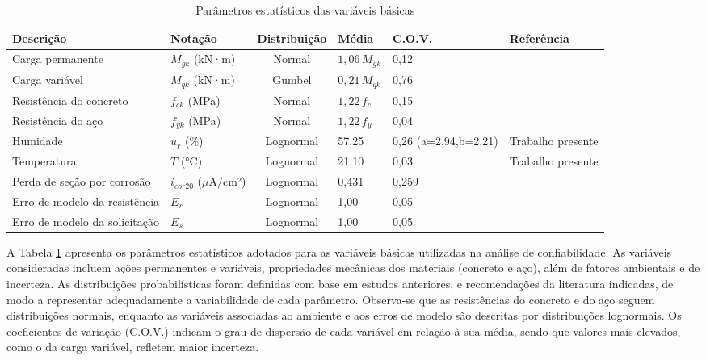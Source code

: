 \begin{table}[H]
\centering
\footnotesize
\caption{Parâmetros estatísticos das variáveis básicas}
\label{tab:estatisticas_vars}
\begin{tabularx}{\textwidth}{
    p{2.2cm}   %
    p{1.5cm}     %
    c          %
    p{1.5cm}          %
    p{2.0cm}     %
    X          %
}
\toprule
\textbf{Descrição} & \textbf{Notação} & \textbf{Distribuição} & \textbf{Média} & \textbf{C.O.V.} & \textbf{Referência} \\ 
\midrule
Carga permanente & $M_{gk}$ (kN·m) & Normal & $1{,}06 \, M_{gk}$ & 0,12 & \cite{pereira_junior_reliability_2023,costa_probabilistic_2023} \\ 
Carga variável & $M_{qk}$ (kN·m) & Gumbel & $0{,}21 \, M_{qk}$ & 0,76 & \cite{costa_probabilistic_2023} \\ 
Resistência do concreto & $f_{ck}$ (MPa) & Normal & $1{,}22 \, f_c$ & 0,15 & \cite{pereira_junior_reliability_2023,costa_probabilistic_2023} \\ 
Resistência do aço & $f_{yk}$ (MPa) & Normal & $1{,}22 \, f_y$ & 0,04 & \cite{pereira_junior_reliability_2023,costa_probabilistic_2023} \\ 
Humidade & $u_r$ (\%) & Lognormal & 57,25 & 0,26 (a=2,94,b=2,21) & Trabalho presente \\ 
Temperatura & $T$ (°C) & Lognormal & 21,10 & 0,03 & Trabalho presente \\ 
Perda de seção por corrosão & $i_{cor 20}$ ($\mu$A/cm²) & Lognormal & 0,431 & 0,259 & \cite{peng_climate_2016} \\ 
Erro de modelo da resistência & $E_r$ & Lognormal & 1,00 & 0,05 & \cite{santos_reliability_2014} \\ 
Erro de modelo da solicitação & $E_s$ & Lognormal & 1,00 & 0,05 & \cite{santos_reliability_2014} \\ 
\bottomrule
\end{tabularx}
\end{table}

A Tabela \ref{tab:estatisticas_vars} apresenta os parâmetros estatísticos adotados para as variáveis básicas utilizadas na análise de confiabilidade. As variáveis consideradas incluem ações permanentes e variáveis, propriedades mecânicas dos materiais (concreto e aço), além de fatores ambientais e de incerteza. As distribuições probabilísticas foram definidas com base em estudos anteriores, e recomendações da literatura indicadas, de modo a representar adequadamente a variabilidade de cada parâmetro. Observa-se que as resistências do concreto e do aço seguem distribuições normais, enquanto as variáveis associadas ao ambiente e aos erros de modelo são descritas por distribuições lognormais. Os coeficientes de variação (C.O.V.) indicam o grau de dispersão de cada variável em relação à sua média, sendo que valores mais elevados, como o da carga variável, refletem maior incerteza.


